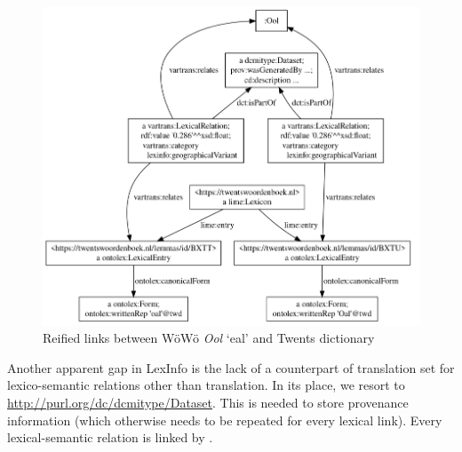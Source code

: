 \documentclass{article}
\newcommand{\word}[1]{\textsl{#1}}
\begin{document}
\begin{figure}
    \centering
    \includegraphics[width=0.5\linewidth]{links-vis.png}
    \caption{Reified  links between WöWö \word{Ool} `eal' and Twents dictionary}
    \label{fig-links}
\end{figure}

% 
% 
% 
% 
% 
% 
% 
% 
% 

Another apparent gap in LexInfo is the lack of a counterpart of translation set for lexico-semantic relations other than translation. In its place, we resort to \url{http://purl.org/dc/dcmitype/Dataset}. This is needed to store provenance information (which otherwise needs to be repeated for every lexical link). Every lexical-semantic relation is linked by .
\end{document}
